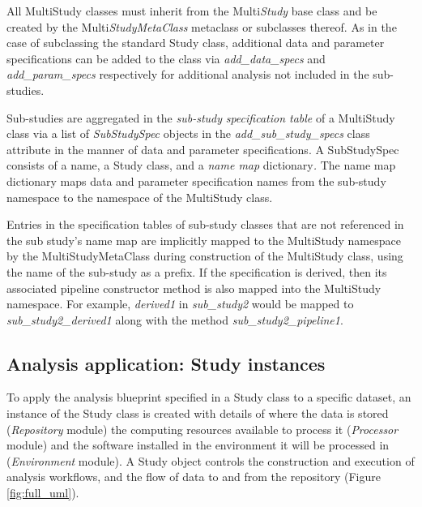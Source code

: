 \documentclass[smallextended]{svjour3}       %
\begin{document}
All MultiStudy classes must inherit from the Multi\emph{Study} base
class and be created by the Multi\emph{StudyMetaClass} metaclass or
subclasses thereof. As in the case of subclassing the standard Study
class, additional data and parameter specifications can be added to the
class via \emph{add\_data\_specs} and \emph{add\_param\_specs}
respectively for additional analysis not included in the sub-studies.

Sub-studies are aggregated in the \emph{sub-study} \emph{specification
table} of a MultiStudy class via a list of \emph{SubStudySpec} objects
in the \emph{add\_sub\_study\_specs} class attribute in the manner of
data and parameter specifications. A SubStudySpec consists of a name, a
Study class, and a \emph{name map} dictionary\emph{.} The name map
dictionary maps data and parameter specification names from the
sub-study namespace to the namespace of the MultiStudy class.

Entries in the specification tables of sub-study classes that are not
referenced in the sub study's name map are implicitly mapped to the
MultiStudy namespace by the MultiStudyMetaClass during construction of the MultiStudy class,
using the name of the sub-study as a prefix.
If the specification is derived, then its associated pipeline constructor method
is also mapped into the MultiStudy namespace. For example, \emph{derived1} in
\emph{sub\_study2} would be mapped to \emph{sub\_study2\_derived1} along
with the method \emph{sub\_study2\_pipeline1}.

\subsection*{Analysis application: Study instances}
\label{analysis-application-study-instances}

To apply the analysis blueprint specified in a Study class to a specific
dataset, an instance of the Study class is created with details of where
the data is stored (\emph{Repository} module) the computing
resources available to process it (\emph{Processor} module) and the software
installed in the environment it will be processed in (\emph{Environment} module).
A Study object controls the construction and execution of analysis workflows,
and the flow of data to and from the repository (Figure \ref{fig:full_uml}).
\end{document}
